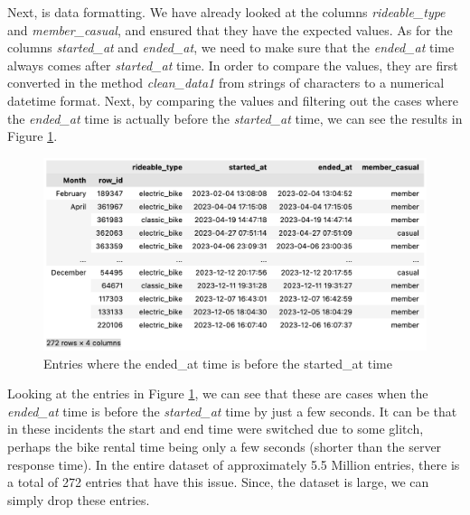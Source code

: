 \documentclass[12pt]{article}
\begin{document}
\begin{itemize}
Next, is data formatting. We have already looked at the columns \textit{rideable\_type} and \textit{member\_casual}, and ensured that they have the expected values. As for the columns \textit{started\_at} and \textit{ended\_at}, we need to make sure that the \textit{ended\_at} time always comes after \textit{started\_at} time. In order to compare the values, they are first converted in the method \textit{clean\_data1} from strings of characters to a numerical datetime format. Next, by comparing the values and filtering out the cases where the \textit{ended\_at} time is actually before the \textit{started\_at} time, we can see the results in Figure \ref{fig8}.

	\begin{figure}[h]
	\centering
	\includegraphics[scale=0.56]{imgNEG.png}
	\caption{Entries where the ended\_at time is before the started\_at time}
	\label{fig8}
	\end{figure}

Looking at the entries in Figure \ref{fig8}, we can see that these are cases when the \textit{ended\_at} time is before the \textit{started\_at} time by just a few seconds. It can be that in these incidents the start and end time were switched due to some glitch, perhaps the bike rental time being only a few seconds (shorter than the server response time). In the entire dataset of approximately 5.5 Million entries, there is a total of 272 entries that have this issue. Since, the dataset is large, we can simply drop these entries.
	
	\end{itemize}

\pagebreak
	
\end{document}
